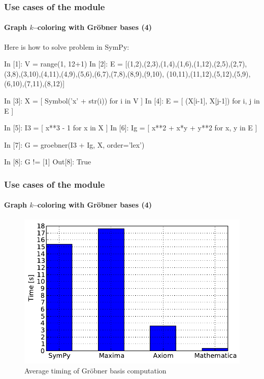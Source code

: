 \documentclass[10pt,polish]{beamer}
\begin{document}
\begin{frame}
\begin{columns}
\begin{column}[r]{0.4\textwidth}
\begin{center}
            \end{center}
        \end{column}
    \end{columns}
\end{frame}

\begin{frame}[fragile]
    \frametitle{Use cases of the module}
    \framesubtitle{Graph $k$--coloring with Gr\"{o}bner bases (4)}

    Here is how to solve  problem in SymPy:
    \begin{python}
In [1]: V = range(1, 12+1)
In [2]: E = [(1,2),(2,3),(1,4),(1,6),(1,12),(2,5),(2,7),
(3,8),(3,10),(4,11),(4,9),(5,6),(6,7),(7,8),(8,9),(9,10),
(10,11),(11,12),(5,12),(5,9),(6,10),(7,11),(8,12)]

In [3]: X = [ Symbol('x' + str(i)) for i in V ]
In [4]: E = [ (X[i-1], X[j-1]) for i, j in E ]

In [5]: I3 = [ x**3 - 1 for x in X ]
In [6]: Ig = [ x**2 + x*y + y**2 for x, y in E ]

In [7]: G = groebner(I3 + Ig, X, order='lex')

In [8]: G != [1]
Out[8]: True
    \end{python}
\end{frame}

\begin{frame}[fragile]
    \frametitle{Use cases of the module}
    \framesubtitle{Graph $k$--coloring with Gr\"{o}bner bases (4)}

    \begin{figure}
        \begin{center}
            \includegraphics[scale=0.55]{images/groebner-time-compare.pdf}
        \end{center}
        \caption{Average timing of Gr\"{o}bner basis computation}
    \end{figure}
\end{frame}
\end{document}
